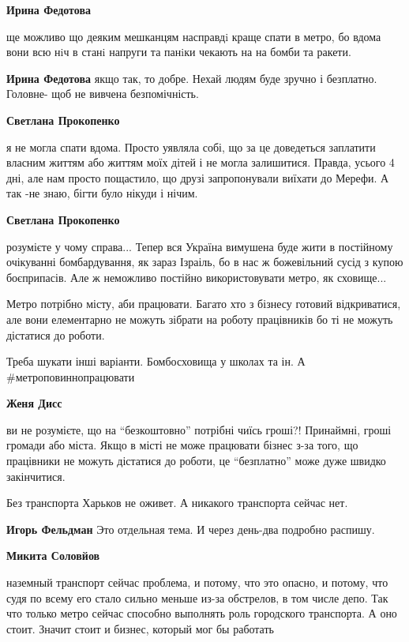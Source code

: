 \begin{itemize}
\begin{itemize} %
\textbf{Ирина Федотова} 

ще можливо що деяким мешканцям насправдi краще спати в метро, бо вдома вони всю
нiч в станi напруги та панiки чекають на на бомби та ракети.

\textbf{Ирина Федотова} якщо так, то добре. Нехай людям буде зручно і безплатно. Головне- щоб не вивчена безпомічність.

\textbf{Светлана Прокопенко} 

я не могла спати вдома. Просто уявляла собі, що за це доведеться заплатити
власним життям або життям моїх дітей і не могла залишитися. Правда, усього 4
дні, але нам просто пощастило, що друзі запропонували виїхати до Мерефи. А так
-не знаю, бігти було нікуди і нічим.

\textbf{Светлана Прокопенко} 

розумієте у чому справа... Тепер вся Україна вимушена буде жити в постійному
очікуванні бомбардування, як зараз Ізраіль, бо в нас ж божевільний сусід з
купою боєприпасів. Але ж неможливо постійно використовувати метро, як
сховище...

Метро потрібно місту, аби працювати. Багато хто з бізнесу готовий відкриватися,
але вони елементарно не можуть зібрати на роботу працівників бо ті не можуть
дістатися до роботи.

Треба шукати інші варіанти. Бомбосховища у школах та ін. А \#метроповиннопрацювати

\textbf{Женя Дисс} 

ви не розумієте, що на \enquote{безкоштовно} потрібні чиїсь гроші?! Принаймні, гроші
громади або міста. Якщо в місті не може працювати бізнес з-за того, що
працівники не можуть дістатися до роботи, це \enquote{безплатно} може дуже швидко
закінчитися.

\end{itemize} %

Без транспорта Харьков не оживет. А никакого транспорта сейчас нет.

\begin{itemize} %
\textbf{Игорь Фельдман} Это отдельная тема. И через день-два подробно распишу.

\textbf{Микита Соловйов} 

наземный транспорт сейчас проблема, и потому, что это опасно, и потому, что
судя по всему его стало сильно меньше из-за обстрелов, в том числе депо. Так
что только метро сейчас способно выполнять роль городского транспорта. А оно
стоит. Значит стоит и бизнес, который мог бы работать


\end{itemize}
\end{itemize}
